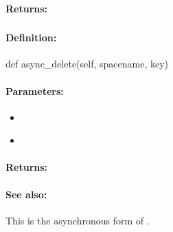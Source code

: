 \paragraph{Returns:}


\pagebreak
\subsubsection{}
\label{api:python:async_del}


\paragraph{Definition:}
\begin{pythoncode}
def async_delete(self, spacename, key)
\end{pythoncode}

\paragraph{Parameters:}
\begin{itemize}[noitemsep]
\item {}\\

\item {}\\

\end{itemize}

\paragraph{Returns:}


\paragraph{See also:}  This is the asynchronous form of .

\pagebreak
\subsubsection{}
\label{api:python:cond_del}


